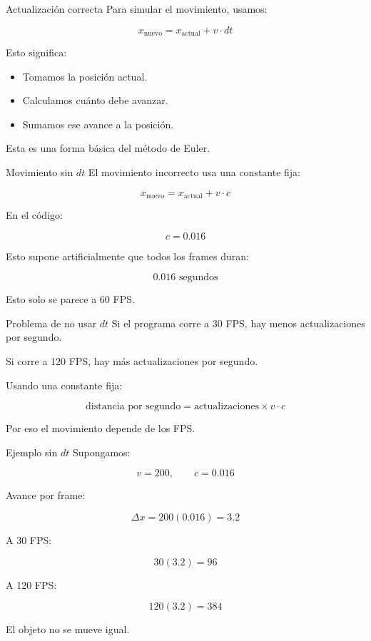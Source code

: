 \documentclass{beamer}
\begin{document}
\begin{frame}{Actualización correcta}
Para simular el movimiento, usamos:

\[
x_{\text{nuevo}} =
x_{\text{actual}} + v \cdot dt
\]

Esto significa:

\begin{itemize}
    \item Tomamos la posición actual.
    \item Calculamos cuánto debe avanzar.
    \item Sumamos ese avance a la posición.
\end{itemize}

Esta es una forma básica del método de Euler.
\end{frame}

\begin{frame}{Movimiento sin \(dt\)}
El movimiento incorrecto usa una constante fija:

\[
x_{\text{nuevo}} =
x_{\text{actual}} + v \cdot c
\]

En el código:

\[
c = 0.016
\]

Esto supone artificialmente que todos los frames duran:

\[
0.016 \text{ segundos}
\]

Esto solo se parece a 60 FPS.
\end{frame}

\begin{frame}{Problema de no usar \(dt\)}
Si el programa corre a 30 FPS, hay menos actualizaciones por segundo.

\medskip

Si corre a 120 FPS, hay más actualizaciones por segundo.

\medskip

Usando una constante fija:

\[
\text{distancia por segundo}
=
\text{actualizaciones} \times v \cdot c
\]

Por eso el movimiento depende de los FPS.
\end{frame}

\begin{frame}{Ejemplo sin \(dt\)}
Supongamos:

\[
v = 200,\qquad c=0.016
\]

Avance por frame:

\[
\Delta x = 200(0.016)=3.2
\]

A 30 FPS:

\[
30(3.2)=96
\]

A 120 FPS:

\[
120(3.2)=384
\]

El objeto no se mueve igual.
\end{frame}
\end{document}

